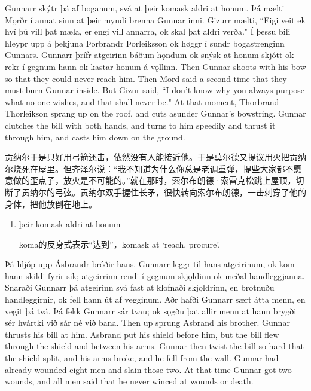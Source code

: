 \begin{paracol}{2}
    Gunnarr skýtr þá af boganum, svá at þeir komask aldri at honum. Þá mælti Mǫrðr í annat sinn at þeir myndi brenna Gunnar inni. Gizurr mælti, ``Eigi veit ek hví þú vill þat mæla, er engi vill annarra, ok skal þat aldri verða." Í þessu bili hleypr upp á þekjuna Þorbrandr Þorleiksson ok høggr í sundr bogastrenginn Gunnars. Gunnarr þrífr atgeirinn báðum hǫndum ok snýsk at honum skjótt ok rekr í gegnum hann ok kastar honum á vǫllinn.
    \switchcolumn
    Then Gunnar shoots with his bow so that they could never reach him. Then Mord said a second time that they must burn Gunnar inside. But Gizur said, ``I don't know why you always purpose what no one wishes, and that shall never be." At that moment, Thorbrand Thorleikson sprang up on the roof, and cuts asunder Gunnar's bowstring. Gunnar clutches the bill with both hands, and turns to him speedily and thrust it through him, and casts him down on the ground.
\end{paracol}
\begin{translation*}{}
    贡纳尔于是只好用弓箭还击，依然没有人能接近他。于是莫尔德又提议用火把贡纳尔烧死在屋里。但齐泽尔说：“我不知道为什么你总是老调重弹，提些大家都不愿意做的歪点子，放火是不可能的。”就在那时，索尔布朗德·索雷克松跳上屋顶，切断了贡纳尔的弓弦。贡纳尔双手握住长矛，很快转向索尔布朗德，一击刺穿了他的身体，把他放倒在地上。
\end{translation*}
\begin{grammar*}{}
    \begin{enumerate}[leftmargin=*]
        \item þeir komask aldri at honum

              koma的反身式表示“达到”，komask at `reach, procure'.
    \end{enumerate}
\end{grammar*}
\begin{paracol}{2}
    Þá hljóp upp Ásbrandr bróðir hans. Gunnarr leggr til hans atgeirinum, ok kom hann skildi fyrir sik; atgeirrinn rendi í gegnum skjǫldinn ok meðal handleggjanna. Snaraði Gunnarr þá atgeirinn svá fast at klofnaði skjǫldrinn, en brotnuðu handleggirnir, ok fell hann út af vegginum. Aðr hafði Gunnarr sært átta menn, en vegit þá tvá. Þá fekk Gunnarr sár tvau; ok sǫgðu þat allir menn at hann brygði sér hvártki við sár né við bana.
    \switchcolumn
    Then up sprung Asbrand his brother. Gunnar thrusts his bill at him. Asbrand put his shield before him, but the bill flew through the shield and between his arms. Gunnar then twist the bill so hard that the shield split, and his arms broke, and he fell from the wall. Gunnar had already wounded eight men and slain those two. At that time Gunnar got two wounds, and all men said that he never winced at wounds or death.
\end{paracol}
